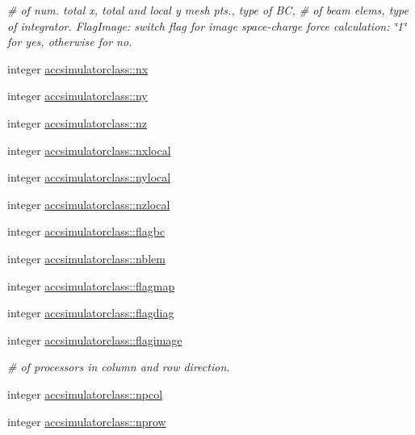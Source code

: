 \textbf{ }\par
{\em \# of num. total x, total and local y mesh pts., type of BC, \# of beam elems, type of integrator. Flag\+Image\+: switch flag for image space-\/charge force calculation\+: \char`\"{}1\char`\"{} for yes, otherwise for no. }\begin{DoxyCompactItemize}
\item 
integer \mbox{\hyperlink{namespaceaccsimulatorclass_af171a5a02a33455149f10b7d37b8bb05}{accsimulatorclass\+::nx}}
\item 
integer \mbox{\hyperlink{namespaceaccsimulatorclass_a613bfb8a3a6c3b3c9b27ffb5e3212dc4}{accsimulatorclass\+::ny}}
\item 
integer \mbox{\hyperlink{namespaceaccsimulatorclass_a04ca8b747bd54d4a8505a69955862aa0}{accsimulatorclass\+::nz}}
\item 
integer \mbox{\hyperlink{namespaceaccsimulatorclass_a5dc8a50cfd7cf88480c61957bd2d3cf5}{accsimulatorclass\+::nxlocal}}
\item 
integer \mbox{\hyperlink{namespaceaccsimulatorclass_a9c87c4ee52e3d4016c11d91c112a7c9d}{accsimulatorclass\+::nylocal}}
\item 
integer \mbox{\hyperlink{namespaceaccsimulatorclass_ae3de189d9f5d65ff6f9b9ff2b9e05772}{accsimulatorclass\+::nzlocal}}
\item 
integer \mbox{\hyperlink{namespaceaccsimulatorclass_a70f0ebae12dbcf56dec3c7ae6f8886c2}{accsimulatorclass\+::flagbc}}
\item 
integer \mbox{\hyperlink{namespaceaccsimulatorclass_a37780aaa58fe89db4f7a2e3c42103e00}{accsimulatorclass\+::nblem}}
\item 
integer \mbox{\hyperlink{namespaceaccsimulatorclass_a65cb81fb31ef5060caa131ca8c257191}{accsimulatorclass\+::flagmap}}
\item 
integer \mbox{\hyperlink{namespaceaccsimulatorclass_a7521d1a707056c51ad6944c43d87ee60}{accsimulatorclass\+::flagdiag}}
\item 
integer \mbox{\hyperlink{namespaceaccsimulatorclass_a0d66f013e8f3cf857e0e569219214394}{accsimulatorclass\+::flagimage}}
\end{DoxyCompactItemize}

\textbf{ }\par
{\em \# of processors in column and row direction. }\begin{DoxyCompactItemize}
\item 
integer \mbox{\hyperlink{namespaceaccsimulatorclass_a77fcd367f3c92fef3f1262ddad064210}{accsimulatorclass\+::npcol}}
\item 
integer \mbox{\hyperlink{namespaceaccsimulatorclass_a49bf0e9e019ba55c31f615832b52fad5}{accsimulatorclass\+::nprow}}
\end{DoxyCompactItemize}


